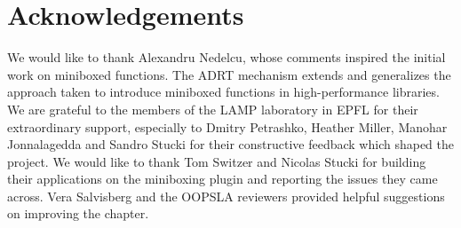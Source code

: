 
\section*{Acknowledgements}


We would like to thank Alexandru Nedelcu, whose comments inspired the initial work on miniboxed functions. The ADRT mechanism extends and generalizes the approach taken to introduce miniboxed functions in high-performance libraries. We are grateful to the members of the LAMP laboratory in EPFL for their extraordinary support, especially to Dmitry Petrashko, Heather Miller, Manohar Jonnalagedda and Sandro Stucki for their constructive feedback which shaped the project. We would like to thank Tom Switzer and Nicolas Stucki for building their applications on the miniboxing plugin and reporting the issues they came across. Vera Salvisberg and the OOPSLA reviewers provided helpful suggestions on improving the chapter.


\quad\quad\quad\quad\quad\quad\quad\quad\quad\quad\quad\quad{}
